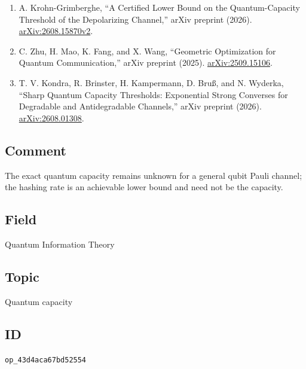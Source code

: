 \begin{enumerate}[label={},leftmargin=4.8em,labelsep=0.5em]
  \item[\textup{[KG26]}]\label{ref:p1-krohn-grimberghe}
  A. Krohn-Grimberghe,
  ``A Certified Lower Bound on the Quantum-Capacity Threshold of the
  Depolarizing Channel,'' arXiv preprint (2026).
  \href{https://arxiv.org/abs/2608.15870}{arXiv:2608.15870v2}.

  \item[\textup{[ZMFW25]}]\label{ref:p1-zhu-mao-fang-wang}
  C. Zhu, H. Mao, K. Fang, and X. Wang,
  ``Geometric Optimization for Quantum Communication,'' arXiv preprint
  (2025).
  \href{https://arxiv.org/abs/2509.15106v1}{arXiv:2509.15106}.

  \item[\textup{[KBK+26]}]\label{ref:p1-kondra-et-al}
  T. V. Kondra, R. Brinster, H. Kampermann, D. Bru{\ss}, and N. Wyderka,
  ``Sharp Quantum Capacity Thresholds: Exponential Strong Converses for
  Degradable and Antidegradable Channels,'' arXiv preprint (2026).
  \href{https://arxiv.org/abs/2608.01308}{arXiv:2608.01308}.
\end{enumerate}

\subsection*{Comment}

The exact quantum capacity remains unknown for a general qubit Pauli channel;
the hashing rate is an achievable lower bound and need not be the capacity.

\subsection*{Field}

Quantum Information Theory

\subsection*{Topic}

Quantum capacity

\subsection*{ID}

\texttt{op\_43d4aca67bd52554}
